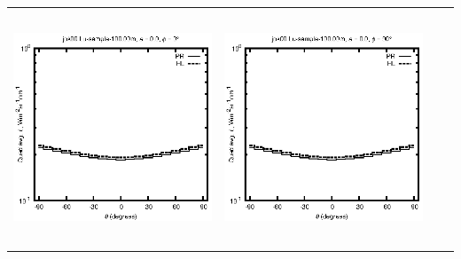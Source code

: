 \begin{tabular}{c c c c}
\includegraphics[height=7cm]{../eps/jok00_Lu_sample_100.00m_fwd.eps} &
\includegraphics[height=7cm]{../eps/jok00_Lu_sample_100.00m_cross.eps} \\
\end{tabular}

\pagebreak

